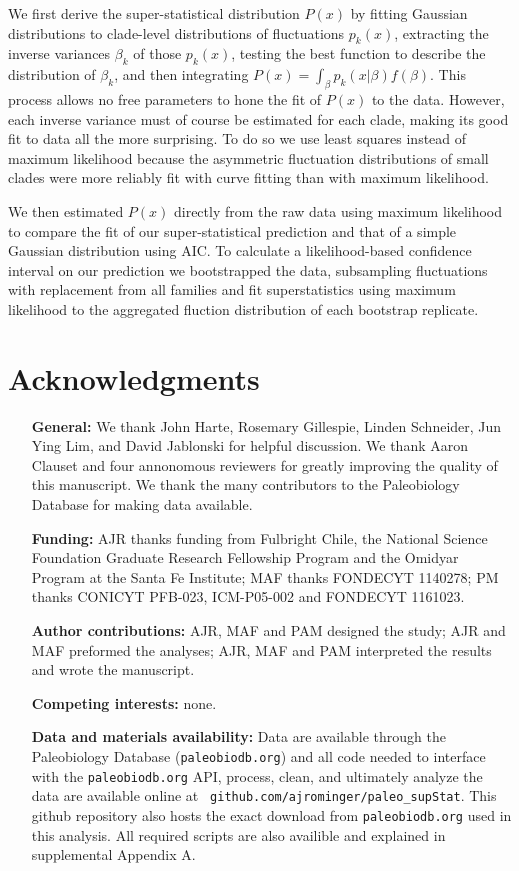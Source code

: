 \documentclass[12pt]{article}
\begin{document}
We first derive the super-statistical distribution $P(x)$ by fitting
Gaussian distributions to clade-level distributions of fluctuations
$p_k(x)$, extracting the inverse variances $\beta_k$ of those
$p_k(x)$, testing the best function to describe the distribution of
$\beta_k$, and then integrating
$P(x) = \int_{\beta}p_k(x | \beta) f(\beta)$. This process allows no
free parameters to hone the fit of $P(x)$ to the data.  However, each
inverse variance must of course be estimated for each clade, making
its good fit to data all the more surprising.  To do so we use least
squares instead of maximum likelihood because the asymmetric
fluctuation distributions of small clades were more reliably fit with
curve fitting than with maximum likelihood.

We then estimated $P(x)$ directly from the raw data using maximum
likelihood to compare the fit of our super-statistical prediction and
that of a simple Gaussian distribution using AIC. To calculate a
likelihood-based confidence interval on our prediction we bootstrapped
the data, subsampling fluctuations with replacement from all families
and fit superstatistics using maximum likelihood to the aggregated
fluction distribution of each bootstrap replicate.





\section*{Acknowledgments}
\begin{itemize}
\item[{\bf General:}] We thank John Harte, Rosemary Gillespie, Linden
  Schneider, Jun Ying Lim, and David Jablonski for helpful
  discussion. We thank Aaron Clauset and four annonomous reviewers for
  greatly improving the quality of this manuscript. We thank the many
  contributors to the Paleobiology Database for making data available.
\item[{\bf Funding:}] AJR thanks funding from Fulbright Chile, the
  National Science Foundation Graduate Research Fellowship Program and
  the Omidyar Program at the Santa Fe Institute; MAF thanks FONDECYT
  1140278; PM thanks CONICYT PFB-023, ICM-P05-002 and FONDECYT
  1161023.
\item[{\bf Author contributions:}] AJR, MAF and PAM designed the
  study; AJR and MAF preformed the analyses; AJR, MAF and PAM
  interpreted the results and wrote the manuscript.
\item[{\bf Competing interests:}] none.
\item[{\bf Data and materials availability:}] Data are available
  through the Paleobiology Database ({\tt paleobiodb.org}) and all
  code needed to interface with the {\tt paleobiodb.org} API, process,
  clean, and ultimately analyze the data are available online at {\tt
    github.com/ajrominger/paleo\_supStat}. This github repository also
  hosts the exact download from {\tt paleobiodb.org} used in this
  analysis. All required scripts are also availible and explained in
  supplemental Appendix A.
\end{itemize}
\end{document}
